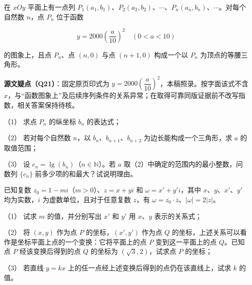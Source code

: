 \begin{question}
在 $xOy$ 平面上有一点列 $P_1(a_1,b_1)$、$P_2(a_2,b_2)$、$\cdots$、$P_n(a_n,b_n)$、$\cdots$。对每个自然数 $n$，点 $P_n$ 位于函数

\nopagebreak[4]
\[
y=2000\left(\dfrac{a}{10}\right)^2\quad(0<a<10)
\]

的图象上，且点 $P_n$、点 $(n,0)$ 与点 $(n+1,0)$ 构成一个以 $P_n$ 为顶点的等腰三角形。

\begin{gktip}
\textbf{源文疑点（Q21）}：固定原页印式为 $y=2000\left(\dfrac{a}{10}\right)^2$，本稿照录。按字面该式不含 $x$，与“函数图象上”及后续序列条件的关系异常；在取得可靠同版证据前不改写指数，相关答案保持待核。
\end{gktip}

（1） 求点 $P_n$ 的纵坐标 $b_n$ 的表达式；

（2） 若对每个自然数 $n$，以 $b_n$、$b_{n+1}$、$b_{n+2}$ 为边长能构成一个三角形，求 $a$ 的取值范围；

（3） 设 $c_n=\lg(b_n)$（$n\in\mathbb{N}$）。若 $a$ 取（2）中确定的范围内的最小整数，问数列 $\{c_n\}$ 前多少项的和最大？试说明理由。

\end{question}
\begin{question}
已知复数 $z_0=1-mi$（$m>0$）、$z=x+yi$ 和 $\omega=x'+y'i$，其中 $x$、$y$、$x'$、$y'$ 均为实数，$i$ 为虚数单位，且对于任意复数 $z$，有 $\omega=\overline{z_0}\cdot\overline{z}$、$|\omega|=2|z|$。

（1） 试求 $m$ 的值，并分别写出 $x'$ 和 $y'$ 用 $x$、$y$ 表示的关系式；

（2） 将 $(x,y)$ 作为点 $P$ 的坐标，$(x',y')$ 作为点 $Q$ 的坐标，上述关系可以看作是坐标平面上点的一个变换：它将平面上的点 $P$ 变到这一平面上的点 $Q$。已知点 $P$ 经该变换后得到的点 $Q$ 的坐标为 $(\sqrt{3},2)$，试求点 $P$ 的坐标；

（3） 若直线 $y=kx$ 上的任一点经上述变换后得到的点仍在该直线上，试求 $k$ 的值。

\end{question}